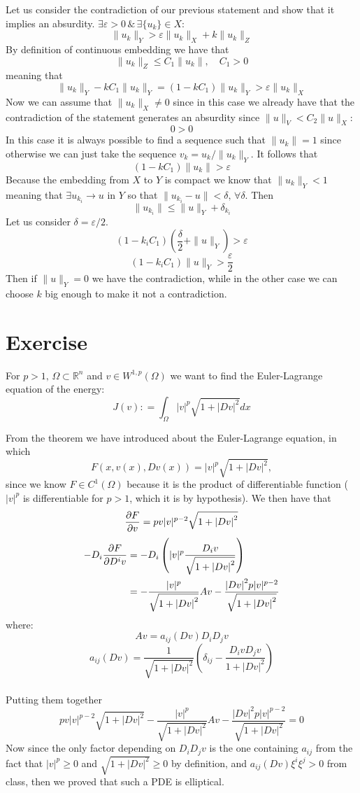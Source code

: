 \documentclass{article}
\newcommand{\R}{\mathbb{R}}
\begin{document}
Let us consider the contradiction of our previous statement and show that it implies an absurdity. $\exists \varepsilon > 0\, \&\, \exists \{ u_k \} \in X$:
\[
    \| u_k \|_Y > \varepsilon \| u_k \|_X + k \| u_k \|_Z 
\]
By definition of continuous embedding we have that
\[
    \| u_k \|_Z \leq C_1 \| u_k \|, \quad C_1 > 0
\]
meaning that
\[
    \| u_k \|_Y - kC_1 \| u_k\|_Y = (1- kC_1) \|u_k\|_Y  > \varepsilon \| u_k \|_X
\]
Now we can assume that $\| u_k \|_X \neq 0$ since in this case we already have that the contradiction of the statement generates an absurdity since $\| u \|_V < C_2 \| u \|_X$:
\[
    0>0
\]
In this case it is always possible to find a sequence such that $\| u_k\|= 1$ since otherwise we can just take the sequence $v_k = u_k / \| u_k \|_Y$. It follows that
\[
    (1-kC_1)\|u_k\| > \varepsilon
\]
Because the embedding from $X$ to $Y$ is compact we know that $\| u_k \|_Y < 1$ meaning that $\exists u_{k_i} \to u$ in $Y$ so that $\| u_{k_i} - u \| < \delta, \, \forall \delta$. Then
\[
    \| u_{k_i} \| \leq \| u \|_Y + \delta_{k_i}
\]
Let us consider $\delta = \varepsilon/2$.
\[
    (1-k_i C_1)( \frac{\delta}{2} + \|u\|_Y) > \varepsilon
\]
\[
    (1-k_i C_1) \|u\|_Y > \frac{\varepsilon}{2}
\]
Then if $\|u\|_Y = 0$ we have the contradiction, while in the other case we can choose $k$ big enough to make it not a contradiction.

\section{Exercise}

For $p>1, \, \Omega \subset \R^n$ and $v\in W^{1,p} (\Omega)$ we want to find the Euler-Lagrange equation of the energy:
\[
    J(v) : = \int_{\Omega} |v|^p \sqrt{1 + {|Dv|}^2} dx
\]

From the theorem we have introduced about the Euler-Lagrange equation, in which 
\[
    F(x, v(x), Dv(x)) = |v|^p \sqrt{1 + {|Dv|}^2},
\]
since we know $F \in C^1(\Omega)$ because it is the product of differentiable function ($|v|^p$ is differentiable for $p>1$, which it is by hypothesis). We then have that\\
\[
    \pdv{F}{v} = p v|v|^{p-2} \sqrt{1+ {|Dv|}^2}
\]
\[
    \begin{split}
        -D_i \pdv{F}{D^i v} &= -D_i \left( |v|^p \frac{D_i v}{\sqrt{1+ {|Dv|}^2}} \right) \\
        & =  - \frac{|v|^p}{\sqrt{1+{|Dv|}^2}} A v - \frac{{|Dv|}^2 p|v|^{p-2}}{\sqrt{1+ {|Dv|}^2}}
    \end{split}
\]
where:\\
\[
    A v = a_{ij}(Dv) D_i D_j v
\]
\[
    a_{ij}(Dv) = \frac{1}{\sqrt{1+{|Dv|}^2}} \left( \delta_{ij} - \frac{D_i v D_j v}{1+{|Dv|}^2} \right)
\]\\
Putting them together
\[
    p v|v|^{p-2} \sqrt{1+ {|Dv|}^2} - \frac{|v|^p}{\sqrt{1+{|Dv|}^2}} A v - \frac{{|Dv|}^2 p|v|^{p-2}}{\sqrt{1+ {|Dv|}^2}} = 0
\]
Now since the only factor depending on $D_i D_j v$ is the one containing $a_{ij}$ from the fact that $|v|^p \geq 0$ and $\sqrt{1+{|Dv|}^2}\geq 0$ by definition, and $a_{ij}(Dv) \xi^i \xi^j >0$ from class, then we proved that such a PDE is elliptical.
\end{document}

